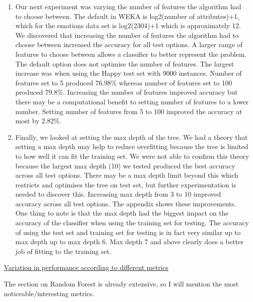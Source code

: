 \begin{enumerate}
    \item Our next experiment was varying the number of features the algorithm had to choose between. The default in WEKA is log2(number of attributes)+1, which for the emotions data set is log2(2304)+1 which is approximately 12. We discovered that increasing the number of features the algorithm had to choose between increased the accuracy for all test options. A larger range of features to choose between allows a classifier to better represent the problem. The default option does not optimise the number of features. The largest increase was when using the Happy test set with 9000 instances. Number of features set to 5 produced 76.98\% whereas number of features set to 100 produced 79.8\%. Increasing the number of features improved accuracy but there may be a computational benefit to setting number of features to a lower number. Setting number of features from 5 to 100 improved the accuracy at most by 2.82\%.
    \item Finally, we looked at setting the max depth of the tree. We had a theory that setting a max depth may help to reduce overfitting because the tree is limited to how well it can fit the training set. We were not able to confirm this theory because the largest max depth (10) we tested produced the best accuracy across all test options. There may be a max depth limit beyond this which restricts and optimises the tree on test set, but further experimentation is needed to discover this. Increasing max depth from 3 to 10 improved accuracy across all test options. The appendix shows these improvements. One thing to note is that the max depth had the biggest impact on the accuracy of the classifier when using the training set for testing. The accuracy of using the test set and training set for testing is in fact very similar up to max depth up to max depth 6. Max depth 7 and above clearly does a better job of fitting to the training set. 
\end{enumerate}


\raggedright\underline{Variation in performance according to different metrics }

The section on Random Forest is already extensive, so I will mention the most noticeable/interesting metrics. 










